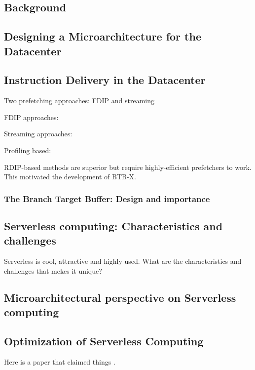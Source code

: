 \documentclass[../main.tex]{subfiles}
\begin{document}
\ifx\chapincluded\undefined
  \begin{refsection}
 \fi


\chapter{Background}

\section{Designing a Microarchitecture for the Datacenter}
\cite{kanev15_profil,ferdman12_clear_cloud}


\section{Instruction Delivery in the Datacenter}


Two prefetching approaches: FDIP and streaming


FDIP approaches: \cite{reinman99_fetch_direc_instr_prefet, kumar17_boomer,kumar18_blast_throug_front_end_bottl_with_shotg,kumar20_shoot_down_server_front_end_bottl}

Streaming approaches:
\cite{ferdman11_proac_instr_fetch,kaynak13_shift,kaynak15_confl}

Profiling based:


RDIP-based methods are superior but require highly-efficient prefetchers to work. This motivated the development of BTB-X.

\subsection{The Branch Target Buffer: Design and importance}




\section{Serverless computing: Characteristics and challenges}
Serverless is cool, attractive and highly used. What are the characteristics and challenges that mekes it unique?

\section{Microarchitectural perspective on Serverless computing}

\section{Optimization of Serverless Computing}


Here is a paper that claimed things \cite{kanev15_profil}.



\ifx\chapincluded\undefined
  \printbibliography
  \end{refsection}
 \fi
\end{document}
